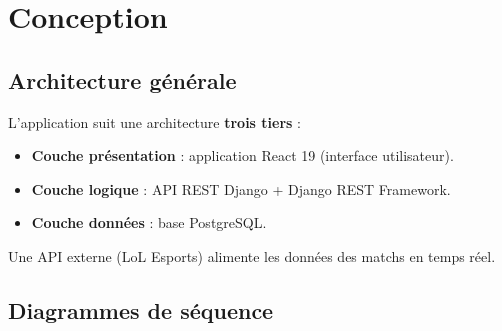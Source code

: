 \documentclass[12pt,a4paper]{report}
\begin{document}
\chapter{Conception}
\section{Architecture générale}
L'application suit une architecture \textbf{trois tiers} :
\begin{itemize}
  \item \textbf{Couche présentation} : application React 19 (interface utilisateur).
  \item \textbf{Couche logique} : API REST Django + Django REST Framework.
  \item \textbf{Couche données} : base PostgreSQL.
\end{itemize}
Une API externe (LoL Esports) alimente les données des matchs en temps réel.

\section{Diagrammes de séquence}

\end{document}

